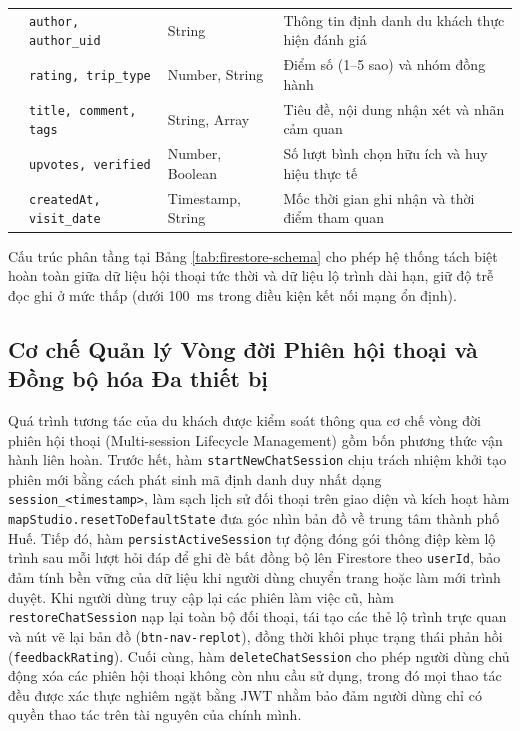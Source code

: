 \begin{table}[htbp]
\begin{tabularx}{\textwidth}{l l l X}
& \texttt{author, author\_uid} & String & Thông tin định danh du khách thực hiện đánh giá \\
& \texttt{rating, trip\_type} & Number, String & Điểm số (1--5 sao) và nhóm đồng hành \\
& \texttt{title, comment, tags} & String, Array & Tiêu đề, nội dung nhận xét và nhãn cảm quan \\
& \texttt{upvotes, verified} & Number, Boolean & Số lượt bình chọn hữu ích và huy hiệu thực tế \\
& \texttt{createdAt, visit\_date} & Timestamp, String & Mốc thời gian ghi nhận và thời điểm tham quan \\
\hline
\end{tabularx}
\end{table}

Cấu trúc phân tầng tại Bảng \ref{tab:firestore-schema} cho phép hệ thống tách biệt hoàn toàn giữa dữ liệu hội thoại tức thời và dữ liệu lộ trình dài hạn, giữ độ trễ đọc ghi ở mức thấp (dưới 100~ms trong điều kiện kết nối mạng ổn định).

\subsection{Cơ chế Quản lý Vòng đời Phiên hội thoại và Đồng bộ hóa Đa thiết bị}
\label{subsec:ch1-session-lifecycle}

Quá trình tương tác của du khách được kiểm soát thông qua cơ chế vòng đời phiên hội thoại (Multi-session Lifecycle Management) gồm bốn phương thức vận hành liên hoàn. Trước hết, hàm \texttt{startNewChatSession} chịu trách nhiệm khởi tạo phiên mới bằng cách phát sinh mã định danh duy nhất dạng \texttt{session\_<timestamp>}, làm sạch lịch sử đối thoại trên giao diện và kích hoạt hàm \texttt{mapStudio.resetToDefaultState} đưa góc nhìn bản đồ về trung tâm thành phố Huế. Tiếp đó, hàm \texttt{persistActiveSession} tự động đóng gói thông điệp kèm lộ trình sau mỗi lượt hỏi đáp để ghi đè bất đồng bộ lên Firestore theo \texttt{userId}, bảo đảm tính bền vững của dữ liệu khi người dùng chuyển trang hoặc làm mới trình duyệt. Khi người dùng truy cập lại các phiên làm việc cũ, hàm \texttt{restoreChatSession} nạp lại toàn bộ đối thoại, tái tạo các thẻ lộ trình trực quan và nút vẽ lại bản đồ (\texttt{btn-nav-replot}), đồng thời khôi phục trạng thái phản hồi (\texttt{feedbackRating}). Cuối cùng, hàm \texttt{deleteChatSession} cho phép người dùng chủ động xóa các phiên hội thoại không còn nhu cầu sử dụng, trong đó mọi thao tác đều được xác thực nghiêm ngặt bằng JWT nhằm bảo đảm người dùng chỉ có quyền thao tác trên tài nguyên của chính mình.

